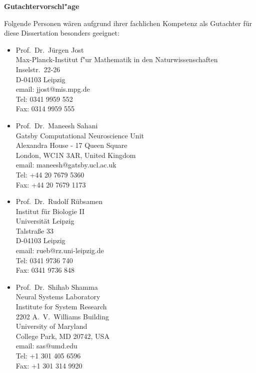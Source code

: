 \newpage
\begin{center}
{\Large \bf 
Gutachtervorschl"age}\vspace{0.5cm}
\end{center}

Folgende Personen w\"aren aufgrund ihrer fachlichen Kompetenz als Gutachter f\"ur diese Dissertation besonders geeignet:
\begin{itemize}
\item Prof.\ Dr.\ J\"urgen Jost\\
  Max-Planck-Institut f"ur Mathematik in den Naturwissenschaften\\
  Inselstr.\ 22-26\\
  D-04103 Leipzig\\
  email: jjost@mis.mpg.de\\
  Tel: 0341 9959 552\\
  Fax: 0314 9959 555\\

\item Prof.\ Dr.\ Maneesh Sahani\\ 
 Gatsby Computational Neuroscience Unit\\
 Alexandra House - 17 Queen Square\\
 London, WC1N 3AR, United Kingdom\\
 email: maneesh@gatsby.ucl.ac.uk\\
 Tel: +44 20 7679 5360\\
 Fax: +44 20 7679 1173\\

\item Prof.\ Dr.\ Rudolf R\"ubsamen\\
 Institut f\"ur Biologie II\\
 Universit\"at Leipzig\\
 Talstra\ss e 33\\
 D-04103 Leipzig\\
 email: rueb@rz.uni-leipzig.de\\
 Tel: 0341 9736 740\\
 Fax: 0341 9736 848\\

\item Prof.\ Dr.\ Shihab Shamma\\
Neural Systems Laboratory\\
Institute for System Research\\
2202 A.\ V.\ Williams Building\\
University of Maryland\\
College Park, MD 20742, USA\\
email: sas@umd.edu\\
Tel: +1 301 405 6596\\
Fax: +1 301 314 9920\\
\end{itemize}

